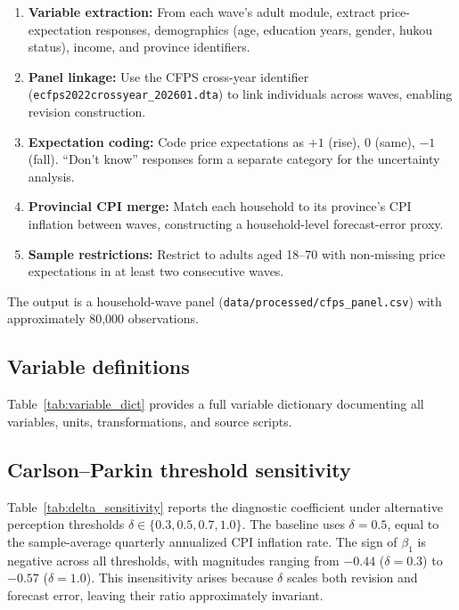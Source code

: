 \begin{enumerate}
  \item \textbf{Variable extraction:} From each wave's
    adult module, extract price-expectation responses,
    demographics (age, education years, gender, hukou
    status), income, and province identifiers.
  \item \textbf{Panel linkage:} Use the CFPS cross-year
    identifier (\texttt{ecfps2022crossyear\_202601.dta})
    to link individuals across waves, enabling revision
    construction.
  \item \textbf{Expectation coding:} Code price
    expectations as $+1$ (rise), $0$ (same), $-1$ (fall).
    ``Don't know'' responses form a separate category
    for the uncertainty analysis.
  \item \textbf{Provincial CPI merge:} Match each
    household to its province's CPI inflation between
    waves, constructing a household-level forecast-error
    proxy.
  \item \textbf{Sample restrictions:} Restrict to adults
    aged 18--70 with non-missing price expectations in
    at least two consecutive waves.
\end{enumerate}

The output is a household-wave panel
(\texttt{data/processed/cfps\_panel.csv}) with
approximately 80,000 observations.

\subsection{Variable definitions}

Table~\ref{tab:variable_dict} provides a full variable
dictionary documenting all variables, units,
transformations, and source scripts.



\subsection{Carlson--Parkin threshold sensitivity}

Table~\ref{tab:delta_sensitivity} reports the diagnostic
coefficient under alternative perception thresholds
$\delta \in \{0.3, 0.5, 0.7, 1.0\}$. The baseline
uses $\delta = 0.5$, equal to the sample-average
quarterly annualized CPI inflation rate. The sign of
$\beta_1$ is negative across all thresholds, with
magnitudes ranging from $-0.44$ ($\delta = 0.3$) to
$-0.57$ ($\delta = 1.0$). This insensitivity arises
because $\delta$ scales both revision and forecast
error, leaving their ratio approximately invariant.



